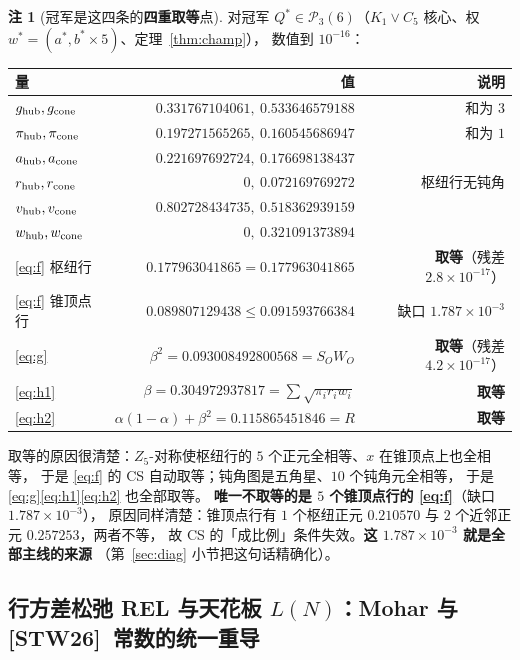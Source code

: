 \documentclass[UTF8,11pt]{ctexart}
\theoremstyle{definition}
\newtheorem{remark}[theorem]{注}
\newcommand{\STW}{\textup{[STW26]}}
\begin{document}
\begin{remark}[冠军是这四条的\textbf{四重取等}点]\label{rmk:quadtight}
对冠军 $Q^*\in\mathcal P_3(6)$（$K_1\vee C_5$ 核心、权 $w^*=(a^*,b^*\times5)$、定理~\ref{thm:champ}），
数值到 $10^{-16}$：
\begin{center}\small
\begin{tabular}{lrr}
\toprule
量 & 值 & 说明\\
\midrule
$g_{\rm hub},g_{\rm cone}$ & $0.331767104061,\ 0.533646579188$ & 和为 $3$\\
$\pi_{\rm hub},\pi_{\rm cone}$ & $0.197271565265,\ 0.160545686947$ & 和为 $1$\\
$a_{\rm hub},a_{\rm cone}$ & $0.221697692724,\ 0.176698138437$ & \\
$r_{\rm hub},r_{\rm cone}$ & $0,\ 0.072169769272$ & 枢纽行无钝角\\
$v_{\rm hub},v_{\rm cone}$ & $0.802728434735,\ 0.518362939159$ & \\
$w_{\rm hub},w_{\rm cone}$ & $0,\ 0.321091373894$ & \\
\midrule
\eqref{eq:f} 枢纽行 & $0.177963041865=0.177963041865$ & \textbf{取等}（残差 $2.8\times10^{-17}$）\\
\eqref{eq:f} 锥顶点行 & $0.089807129438\le0.091593766384$ & 缺口 $1.787\times10^{-3}$\\
\eqref{eq:g} & $\beta^2=0.093008492800568=S_OW_O$ & \textbf{取等}（残差 $4.2\times10^{-17}$）\\
\eqref{eq:h1} & $\beta=0.304972937817=\sum\sqrt{\pi_ir_iw_i}$ & \textbf{取等}\\
\eqref{eq:h2} & $\alpha(1-\alpha)+\beta^2=0.115865451846=R$ & \textbf{取等}\\
\bottomrule
\end{tabular}
\end{center}
取等的原因很清楚：$Z_5$-对称使枢纽行的 $5$ 个正元全相等、$x$ 在锥顶点上也全相等，
于是 \eqref{eq:f} 的 CS 自动取等；钝角图是五角星、$10$ 个钝角元全相等，
于是 \eqref{eq:g}\eqref{eq:h1}\eqref{eq:h2} 也全部取等。
\textbf{唯一不取等的是 $5$ 个锥顶点行的 \eqref{eq:f}}（缺口 $1.787\times10^{-3}$），
原因同样清楚：锥顶点行有 $1$ 个枢纽正元 $0.210570$ 与 $2$ 个近邻正元 $0.257253$，两者不等，
故 CS 的「成比例」条件失效。\textbf{这 $1.787\times10^{-3}$ 就是全部主线的来源}
（第~\ref{sec:diag} 小节把这句话精确化）。
\end{remark}

\subsection{行方差松弛 REL 与天花板 $L(N)$：Mohar 与 \STW\ 常数的统一重导}\label{sec:relax}
\end{document}
